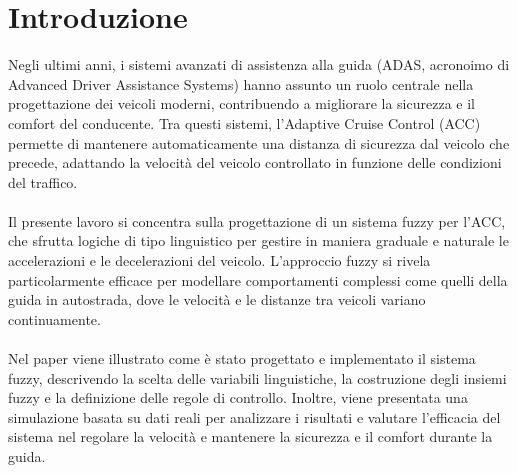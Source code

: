 \chapter*{Introduzione}  
Negli ultimi anni, i sistemi avanzati di assistenza alla guida (ADAS, acronoimo di Advanced Driver Assistance Systems) hanno assunto 
un ruolo centrale nella progettazione dei veicoli moderni, contribuendo a migliorare la sicurezza e il comfort del conducente. 
Tra questi sistemi, l'Adaptive Cruise Control (ACC) permette di mantenere automaticamente una distanza di sicurezza dal 
veicolo che precede, adattando la velocità del veicolo controllato in funzione delle condizioni del traffico.
\\\\
\noindent Il presente lavoro si concentra sulla progettazione di un sistema fuzzy per l'ACC, che sfrutta logiche di tipo 
linguistico per gestire in maniera graduale e naturale le accelerazioni e le decelerazioni del veicolo. L'approccio 
fuzzy si rivela particolarmente efficace per modellare comportamenti complessi come quelli della guida in autostrada,
dove le velocità e le distanze tra veicoli variano continuamente.
\\\\
\noindent Nel paper viene illustrato come è stato progettato e implementato il sistema fuzzy, descrivendo la scelta 
delle variabili linguistiche, la costruzione degli insiemi fuzzy e la definizione delle regole di controllo. Inoltre, 
viene presentata una simulazione basata su dati reali per analizzare i risultati e valutare l'efficacia del sistema nel 
regolare la velocità e mantenere la sicurezza e il comfort durante la guida.



